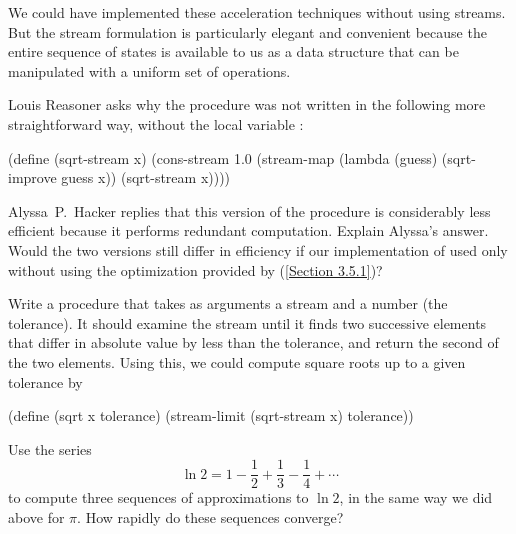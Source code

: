 We could have implemented these acceleration techniques without using streams.
But the stream formulation is particularly elegant and convenient because the entire sequence of states is available to us as a data structure that can be manipulated with a uniform set of operations.



\begin{exercise}
	\label{Exercise 3.63}
	Louis Reasoner asks why the  procedure was not written in the following more straightforward way, without the local variable :
	\begin{scheme}
	  (define (sqrt-stream x)
	    (cons-stream 1.0 (stream-map
	                      (lambda (guess)
	                        (sqrt-improve guess x))
	                      (sqrt-stream x))))
	\end{scheme}
	Alyssa~P.~Hacker replies that this version of the procedure is considerably less efficient because it performs redundant computation.
	Explain Alyssa’s answer.
	Would the two versions still differ in efficiency if our implementation of  used only  without using the optimization provided by  (\cref{Section 3.5.1})?
\end{exercise}



\begin{exercise}
	\label{Exercise 3.64}
	Write a procedure  that takes as arguments a stream and a number (the tolerance).
	It should examine the stream until it finds two successive elements that differ in absolute value by less than the tolerance, and return the second of the two elements.
	Using this, we could compute square roots up to a given tolerance by

	\begin{scheme}
	  (define (sqrt x tolerance)
	    (stream-limit (sqrt-stream x) tolerance))
	\end{scheme}
\end{exercise}



\begin{exercise}
	\label{Exercise 3.65}
	Use the series
	\[
		\ln 2 = 1 - \frac{1}{2} + \frac{1}{3} - \frac{1}{4} + \dotsb
	\]
	to compute three sequences of approximations to \( \ln 2 \), in the same way we did above for \( π \).
	How rapidly do these sequences converge?
\end{exercise}




